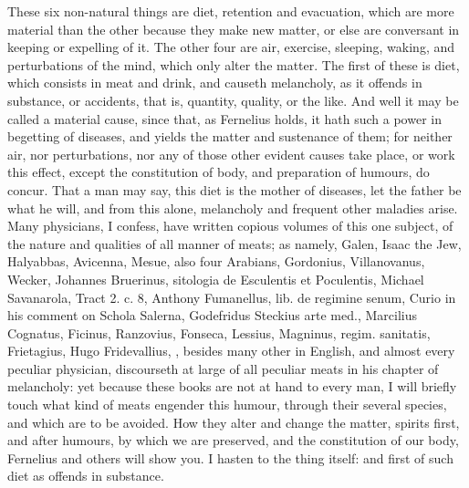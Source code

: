 {{These six non-natural things are diet, retention and evacuation, which
are more material than the other because they make new matter, or else
are conversant in keeping or expelling of it. The other four are air,
exercise, sleeping, waking, and perturbations of the mind, which only
alter the matter. The first of these is diet, which consists in meat
and drink, and causeth melancholy, as it offends in substance, or
accidents, that is, quantity, quality, or the like. And well it may be
called a material cause, since that, as Fernelius holds, it hath
such a power in begetting of diseases, and yields the matter and
sustenance of them; for neither air, nor perturbations, nor any of
those other evident causes take place, or work this effect, except the
constitution of body, and preparation of humours, do concur. That a man
may say, this diet is the mother of diseases, let the father be what he
will, and from this alone, melancholy and frequent other maladies
arise. Many physicians, I confess, have written copious volumes of this
one subject, of the nature and qualities of all manner of meats; as
namely, Galen, Isaac the Jew, Halyabbas, Avicenna, Mesue, also four
Arabians, Gordonius, Villanovanus, Wecker, Johannes Bruerinus,
sitologia de Esculentis et Poculentis, Michael Savanarola, Tract 2. c.
8, Anthony Fumanellus, lib. de regimine senum, Curio in his comment on
Schola Salerna, Godefridus Steckius arte med., Marcilius Cognatus,
Ficinus, Ranzovius, Fonseca, Lessius, Magninus, regim. sanitatis,
Frietagius, Hugo Fridevallius, \etc{}, besides many other in
English, and almost every peculiar physician, discourseth at
large of all peculiar meats in his chapter of melancholy: yet because
these books are not at hand to every man, I will briefly touch what
kind of meats engender this humour, through their several species, and
which are to be avoided. How they alter and change the matter, spirits
first, and after humours, by which we are preserved, and the
constitution of our body, Fernelius and others will show you. I hasten
to the thing itself: and first of such diet as offends in substance.

}}

